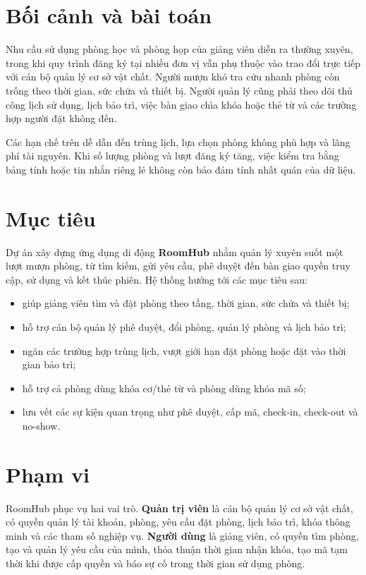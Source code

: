 \section{Bối cảnh và bài toán}

Nhu cầu sử dụng phòng học và phòng họp của giảng viên diễn ra thường xuyên, trong khi quy trình đăng ký tại nhiều đơn vị vẫn phụ thuộc vào trao đổi trực tiếp với cán bộ quản lý cơ sở vật chất. Người mượn khó tra cứu nhanh phòng còn trống theo thời gian, sức chứa và thiết bị. Người quản lý cũng phải theo dõi thủ công lịch sử dụng, lịch bảo trì, việc bàn giao chìa khóa hoặc thẻ từ và các trường hợp người đặt không đến.

Các hạn chế trên dễ dẫn đến trùng lịch, lựa chọn phòng không phù hợp và lãng phí tài nguyên. Khi số lượng phòng và lượt đăng ký tăng, việc kiểm tra bằng bảng tính hoặc tin nhắn riêng lẻ không còn bảo đảm tính nhất quán của dữ liệu.

\section{Mục tiêu}

Dự án xây dựng ứng dụng di động \textbf{RoomHub} nhằm quản lý xuyên suốt một lượt mượn phòng, từ tìm kiếm, gửi yêu cầu, phê duyệt đến bàn giao quyền truy cập, sử dụng và kết thúc phiên. Hệ thống hướng tới các mục tiêu sau:

\begin{itemize}
  \item giúp giảng viên tìm và đặt phòng theo tầng, thời gian, sức chứa và thiết bị;
  \item hỗ trợ cán bộ quản lý phê duyệt, đổi phòng, quản lý phòng và lịch bảo trì;
  \item ngăn các trường hợp trùng lịch, vượt giới hạn đặt phòng hoặc đặt vào thời gian bảo trì;
  \item hỗ trợ cả phòng dùng khóa cơ/thẻ từ và phòng dùng khóa mã số;
  \item lưu vết các sự kiện quan trọng như phê duyệt, cấp mã, check-in, check-out và no-show.
\end{itemize}

\section{Phạm vi}

RoomHub phục vụ hai vai trò. \textbf{Quản trị viên} là cán bộ quản lý cơ sở vật chất, có quyền quản lý tài khoản, phòng, yêu cầu đặt phòng, lịch bảo trì, khóa thông minh và các tham số nghiệp vụ. \textbf{Người dùng} là giảng viên, có quyền tìm phòng, tạo và quản lý yêu cầu của mình, thỏa thuận thời gian nhận khóa, tạo mã tạm thời khi được cấp quyền và báo sự cố trong thời gian sử dụng phòng.

